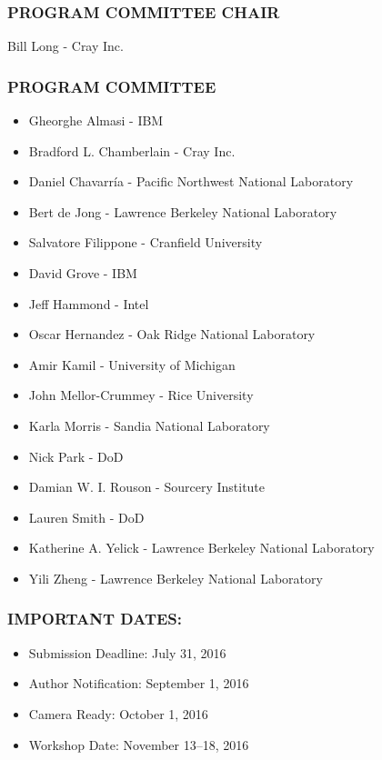 \documentclass[12pt]{article}
\begin{document}
\subsubsection*{PROGRAM COMMITTEE CHAIR}
Bill Long - Cray Inc. 

\subsubsection*{PROGRAM COMMITTEE}
\begin{itemize}
  \item Gheorghe Almasi - IBM
  \item Bradford L. Chamberlain - Cray Inc.
  \item Daniel Chavarr\'{i}a - Pacific Northwest National Laboratory
  \item Bert de Jong - Lawrence Berkeley National Laboratory
  \item Salvatore Filippone - Cranfield University 
  \item David Grove - IBM
  \item Jeff Hammond - Intel 
  \item Oscar Hernandez - Oak Ridge National Laboratory
  \item Amir Kamil - University of Michigan 
  \item John Mellor-Crummey - Rice University
  \item Karla Morris - Sandia National Laboratory
  \item Nick Park - DoD
  \item Damian W. I. Rouson - Sourcery Institute
  \item Lauren Smith - DoD 
  \item Katherine A. Yelick - Lawrence Berkeley National Laboratory 
  \item Yili Zheng - Lawrence Berkeley National Laboratory 
\end{itemize}  

\subsubsection*{IMPORTANT DATES:}
\begin{itemize}
  \item Submission Deadline: July 31, 2016 
  \item Author Notification: September 1, 2016
  \item Camera Ready:        October 1, 2016
  \item Workshop Date:       November 13--18, 2016
\end{itemize}  
\end{document}
